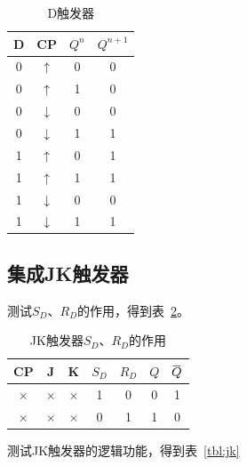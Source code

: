 \documentclass[a4paper,twoside]{ctexart}
\newcommand{\ols}[1]{\mskip.5\thinmuskip\overline{\mskip-.5\thinmuskip {#1} \mskip-.5\thinmuskip}\mskip.5\thinmuskip}
\begin{document}
\begin{spacing}{1.2}
\begin{table}[htbp]
	\centering
	\caption{D触发器}
	\label{tbl:dtg}
	\begin{tabular}{c|c|c|c}
		\toprule
		\hline
		D & CP & $Q^n$& $Q^{n+1}$ \\
		\hline
		0 & $\uparrow$ & 0 & 0 \\
		0 & $\uparrow$ & 1 & 0 \\
		0 & $\downarrow$ & 0 & 0 \\
		0 & $\downarrow$ & 1 & 1 \\
		1 & $\uparrow$ & 0 & 1 \\
		1 & $\uparrow$ & 1 & 1 \\
		1 & $\downarrow$ & 0 & 0 \\
		1 & $\downarrow$ & 1 & 1 \\
		\hline
		\bottomrule
	\end{tabular}
\end{table}

\subsection{集成JK触发器}

测试$S_D$、$R_D$的作用，得到表~\ref{tbl:jksr}。

\begin{table}[htbp]
	\centering
	\caption{JK触发器$S_D$、$R_D$的作用}
	\label{tbl:jksr}
	\begin{tabular}{c|c|c|c|c|c|c}
		\toprule
		\hline
		CP & J & K & $S_D$ & $R_D$ & $Q$ & $\ols{Q}$ \\
		\hline
		$\times$ & $\times$ & $\times$ & 1 & 0 & 0 & 1 \\
		$\times$ & $\times$ & $\times$ & 0 & 1 & 1 & 0 \\
		\hline
		\bottomrule
	\end{tabular}
\end{table}

测试JK触发器的逻辑功能，得到表~\ref{tbl:jk}


\end{spacing}
\end{document}
